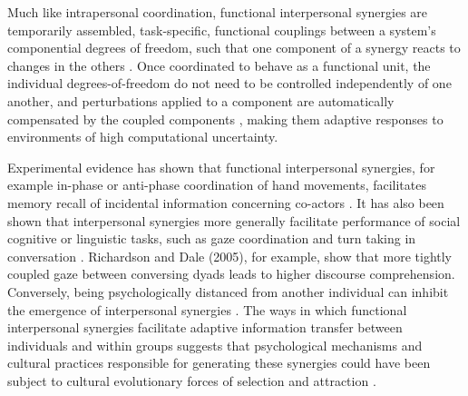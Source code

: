 Much like intrapersonal coordination, functional interpersonal synergies are temporarily assembled, task-specific, functional couplings between a system's componential degrees of freedom, such that one component of a synergy reacts to changes in the others \citep{Kelso2009}.  Once coordinated to behave as a functional unit, the individual degrees-of-freedom do not need to be controlled independently of one another, and perturbations applied to a component are automatically compensated by the coupled components \citep{Kelso1984,Latash2002,Riley2011}, making them adaptive responses to environments of high computational uncertainty.

Experimental evidence has shown that functional interpersonal synergies, for example in-phase or anti-phase coordination of hand movements, facilitates memory recall of incidental information concerning co-actors \citep{Miles2010}. It has also been shown that interpersonal synergies more generally facilitate performance of social cognitive or linguistic tasks, such as gaze coordination and turn taking in conversation \citep{Richardson2005,Shockley2009}.  Richardson and Dale (2005), for example, show that more tightly coupled gaze between conversing dyads leads to higher discourse comprehension.  Conversely, being psychologically distanced from another individual can inhibit the emergence of interpersonal synergies \citep{Miles2010}.  The ways in which functional interpersonal synergies facilitate adaptive information transfer between individuals and within groups suggests that psychological mechanisms and cultural practices responsible for generating these synergies could have been subject to cultural evolutionary forces of selection and attraction \citep{Claidiere2014,Mesoudi2016a}.

